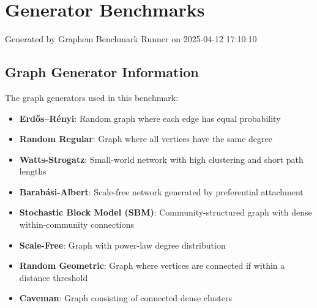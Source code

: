 \documentclass{article}
\begin{document}
\section*{Generator Benchmarks}
Generated by Graphem Benchmark Runner on 2025-04-12 17:10:10
\subsection*{Graph Generator Information}
The graph generators used in this benchmark:
\begin{itemize}
\item \textbf{Erdős–Rényi}: Random graph where each edge has equal probability
\item \textbf{Random Regular}: Graph where all vertices have the same degree
\item \textbf{Watts-Strogatz}: Small-world network with high clustering and short path lengths
\item \textbf{Barabási-Albert}: Scale-free network generated by preferential attachment
\item \textbf{Stochastic Block Model (SBM)}: Community-structured graph with dense within-community connections
\item \textbf{Scale-Free}: Graph with power-law degree distribution
\item \textbf{Random Geometric}: Graph where vertices are connected if within a distance threshold
\item \textbf{Caveman}: Graph consisting of connected dense clusters
\end{itemize}
\end{document}

